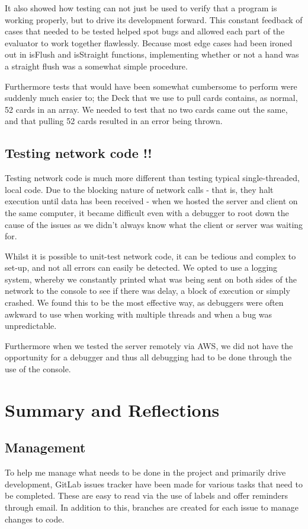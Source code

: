 \documentclass[11pt]{article}
\begin{document}
It also showed how testing can not just be used to verify that a program is working properly, but to drive its development forward. This constant feedback of cases that needed to be tested helped spot bugs and allowed each part of the evaluator to work together flawlessly. Because most edge cases had been ironed out in isFlush and isStraight functions, implementing whether or not a hand was a straight flush was a somewhat simple procedure. 

Furthermore tests that would have been somewhat cumbersome to perform were suddenly much easier to; the Deck that we use to pull cards contains, as normal, 52 cards in an array. We needed to test that no two cards came out the same, and that pulling 52 cards resulted in an error being thrown. 


\subsection{Testing network code !!}
Testing network code is much more different than testing typical single-threaded, local code. Due to the blocking nature of network calls - that is, they halt execution until data has been received - when we hosted the server and client on the same computer, it became difficult even with a debugger to root down the cause of the issues as we didn't always know what the client or server was waiting for. 

Whilst it is possible to unit-test network code, it can be tedious and complex to set-up, and not all errors can easily be detected. We opted to use a logging system, whereby we constantly printed what was being sent on both sides of the network to the console to see if there was delay, a block of execution or simply crashed. We found this to be the most effective way, as debuggers were often awkward to use when working with multiple threads and when a bug was unpredictable.

Furthermore when we tested the server remotely via AWS, we did not have the opportunity for a debugger and thus all debugging had to be done through the use of the console.


\section{Summary and Reflections}
\subsection{Management}
To help me manage what needs to be done in the project and primarily drive development, GitLab issues tracker have been made for various tasks that need to be completed. These are easy to read via the use of labels and offer reminders through email. In addition to this, branches are created for each issue to manage changes to code. \\
\end{document}
